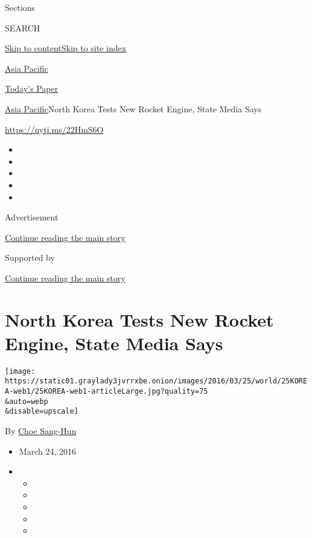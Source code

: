 Sections

SEARCH

\protect\hyperlink{site-content}{Skip to
content}\protect\hyperlink{site-index}{Skip to site index}

\href{https://www.nytimes3xbfgragh.onion/section/world/asia}{Asia
Pacific}

\href{https://myaccount.nytimes3xbfgragh.onion/auth/login?response_type=cookie\&client_id=vi}{}

\href{https://www.nytimes3xbfgragh.onion/section/todayspaper}{Today's
Paper}

\href{/section/world/asia}{Asia Pacific}\textbar{}North Korea Tests New
Rocket Engine, State Media Says

\url{https://nyti.ms/22HmS6O}

\begin{itemize}
\item
\item
\item
\item
\item
\end{itemize}

Advertisement

\protect\hyperlink{after-top}{Continue reading the main story}

Supported by

\protect\hyperlink{after-sponsor}{Continue reading the main story}

\hypertarget{north-korea-tests-new-rocket-engine-state-media-says}{%
\section{North Korea Tests New Rocket Engine, State Media
Says}\label{north-korea-tests-new-rocket-engine-state-media-says}}

\texttt{[image: https://static01.graylady3jvrrxbe.onion/images/2016/03/25/world/25KOREA-web1/25KOREA-web1-articleLarge.jpg?quality=75\\\&auto=webp\\\&disable=upscale]}

By \href{http://www.nytimes3xbfgragh.onion/by/choe-sang-hun}{Choe
Sang-Hun}

\begin{itemize}
\item
  March 24, 2016
\item
  \begin{itemize}
  \item
  \item
  \item
  \item
  \item
  \end{itemize}
\end{itemize}

